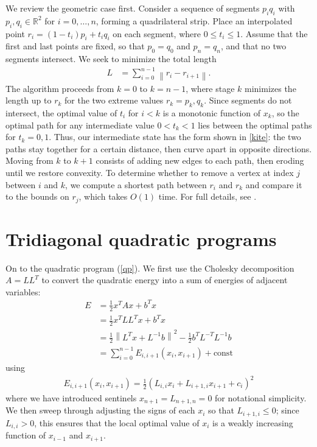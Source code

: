 \documentclass[11pt]{article}
\newcommand{\R}{\mathbb{R}}
\begin{document}
We review the geometric case first.  Consider a sequence of segments $p_i q_i$ with $p_i, q_i \in \R^2$ for $i = 0, \ldots, n$, forming a quadrilateral strip.  Place an interpolated point
$r_i = (1-t_i) p_i + t_i q_i$ on each segment, where $0 \le t_i \le 1$.  Assume that the first and last points are fixed, so that $p_0 = q_0$ and $p_n = q_n$, and that no two segments intersect.
We seek to minimize the total length
\begin{align*}
L &= \sum_{i=0}^{n-1} \left\| r_i - r_{i+1} \right\|.
\end{align*}
The algorithm proceeds from $k = 0$ to $k = n-1$, where stage $k$ minimizes the length up to $r_k$ for the two extreme values $r_k = p_k, q_k$.  Since segments do not intersect, the optimal value
of $t_i$ for $i < k$ is a monotonic function of $x_k$, so the optimal path for any intermediate value $0 < t_k < 1$ lies between the optimal paths for $t_k = 0,1$.  Thus, our intermediate state has the form shown in
\autoref{kite}: the two paths stay together for a certain distance, then curve apart in opposite directions.  Moving from $k$ to $k+1$ consists of adding new edges to each path, then eroding until
we restore convexity.  To determine whether to remove a vertex at index $j$ between $i$ and $k$, we compute a shortest path between $r_i$ and $r_k$ and compare it to the bounds on $r_j$, which takes $O(1)$ time.
For full details, see \cite{lee1984euclidean}.

\section{Tridiagonal quadratic programs}

On to the quadratic program (\autoref{qp}).  We first use the Cholesky decomposition $A = L L^T$ to convert the quadratic energy into a sum of energies of adjacent variables:
\begin{align*}
E &= \frac{1}{2} x^T A x + b^T x  \\
  &= \frac{1}{2} x^T L L^T x + b^T x \\
  &= \frac{1}{2} \left\|L^T x + L^{-1}b \right\|^2 - \frac{1}{2} b^T L^{-T} L^{-1} b \\
  &= \sum_{i=0}^{n-1} E_{i,i+1}(x_i,x_{i+1}) + \textrm{const}
\end{align*}
using
\begin{align} \label{quadratic}
E_{i,i+1}(x_i,x_{i+1}) = \frac{1}{2} (L_{i,i} x_i + L_{i+1,i} x_{i+1} + c_i)^2
\end{align}
where we have introduced sentinels $x_{n+1} = L_{n+1,n} = 0$ for notational simplicity.  We then sweep through adjusting the signs of each $x_i$ so that $L_{i+1,i} \le 0$; since $L_{i,i} > 0$, this
ensures that the local optimal value of $x_i$ is a weakly increasing function of $x_{i-1}$ and $x_{i+1}$.
\end{document}
